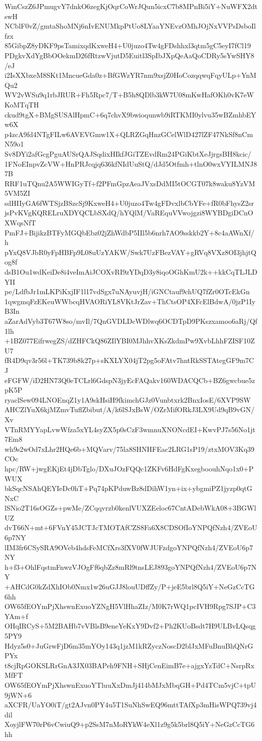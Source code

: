 WmCszZ6JPmugvY7dnkO6zegKjOqrCoWrJQun5icxC7b8MPnBi5iY+NuWFX2dtswH
NCblF0vZ/gmtaShoMNj6nIvENUMkpPtUo8LYaaYNEvzOMhJOjNxVVPsDsboIlfzx
85GibpZ8yDKF9psTamixqdKxweH4+U0juzo4Tw4gFDshhxl3qtm5gC5eyI7fCl19
PDgkvXdYgBbOOekmD26fRtzwVjutD5Euitl3SpIbJXpQeAaQoCDRy5sYwSHY8/eJ
i2IsXXbxeM8SKt1MncueGda0z+BfGWzYR7nm9xsjZ0HoCozqqwqFqyULp+YnMQu2
WV2vWSu9q1rbJRUR+Fh5Rpc7/T+B5h8QDlb3kW7U08mKwHafOKh0vK7eWKoMTqTH
ckud9tgX+BMgSUSAlHpmC+6q7chvX9bwioqunwb9iRTKMI0ylvu35wBZmhbEYw6X
p4zcA9fd4NTgFILw6AVEVGmw1X+QLRZGqHnzGCelWlD427lZF47NkSf8nCmN59o1
Sv8DYi2afGcgPguAUSrQAJSqdixHIkfJGiTZEvdRm24PGiKbtXeJjrgsBH8kcic/
1FNoEInpvZcVW+HnPRJcqjq636kfNIdUuStQ/dJd5Otfmh+tlnO0wxVYILMNJ87B
RRF1uTQnu2A5WWIGyTf+f2PFmGpzAeaJVxsDdMI5tOCGT07k8waku8YzVM5VM5ZI
sdHIIyGA6fWTSjzBSzcSj9KxweH4+U0juzo4Tw4gFDvxlbCbYFe+fR0bFhysZ2sr
jsPvKVgKQRELruXDYQCLbSXdQ/hYQlM/VaREquVVwojgzi8WYBDgiDCnOXWqsNfT
PmFJ+BijikzBTFyMGQbEbz02jZhWdbP5IIl5b6nrh7AO9sskkb2Y+8c4aAWnXf/h
pYxQ8VJbR0yFpHBFp9L08uUzYAKW/Swk7UzFBezVAY+gRVq8VXz8OI3jhjtQog8f
dsB1Ou1wdKeiDe8i4veImAiJCOXvRI9zYDqD3y8iqoOGhKmU2k++kkCqTLJLDYII
pe/LdfbJr1mLKPiKxjIF1l17vdSgx7uNAyuvjH/iGNCtauf9chUQ7fZr0OTcEkGn
1qwgmqFzEKeuWWbcqHVAORiYL8VKtJrZav+ThCtsOP4XFcElBdwA/0jzP1IyB3In
aZarAdVyb3T67W8so/mvIl/7QnGVDLDcWDlwq6OCDTpD9PKszxamoo6aRj/Qf1lh
+1BZ077EifrwegZS/dZHFCkQ86ZIlYBI0MJhhvXKsZkdmPw9XvbLhhFZISF10ZU7
fR4D9qv3r56l+TK739b8k27p+sKXLYX04jT2pg5oFAtv7hntRkSSTAtegGF9m7CJ
eFGFW/iD2HN73Q0eTCLrl6GdspN3jyEcFAQakv160WDACQCb+BZ6gwcbue5zpK5P
ryaclSew094LNOEnqZ1y1A9skHsiH9fkimchGJz0Vunbtxrk2BnxIosE/6XVP9SW
AHCZlYuX6kjMZmvTuflZbibut/A/k6lSJxBsW/OZrMifORkJ3LX9Ud9qB9vGN/Xv
VTnRMYYapLvwWfza5xYL4syZX5p0sCzF3wmnuXNONcdEI+KwvPJ7s56No1jt7Em8
wh9s2wOd7xLhr2HQe6b+MQVarv/75la8SHNHFEac2LRG1sP19/ztxMOV3Kq39COc
hpc/RW+jwgEKjEt4jDbTglo/DXuJOzFQQc1ZKFv6HdFgKxegboouhNqo1x0+PWUX
bkSqcNSAhQEYIeDc0hT+Pq74pKPduwBz8dDihW1yn+ix+ybgmiPZ1jyzp0qtGNxC
lSNio2T16sOGZs+pwMe/ZCqqvrzb0kenlVUXZEeloc67CntADebWkA08+3BGWlUZ
dvT66N+mt+6FVnY45JCTJcTMOTAfCZS8Fa6X8CDSOfIoYNPQfNzh4/ZVEoU6p7NY
lIM3fr6CSySRA9OVeb4hdsFeMCfXrs3fXV0fWJUFzdgoYNPQfNzh4/ZVEoU6p7NY
h+f3+OhlFqstmFnwzVJOgFf6qbZz8mRl9tnsLEJ893goYNPQfNzh4/ZVEoU6p7NY
+AHCdG0kZdXhIOb0Nmx1w26uGJJ8louUDffZy/P+jeE5brl8Q5iY+NeGzCcTG6hh
OW65fEOYmPjXhswnExuoYZNgH5VlHhaZIz/M0K7rWQ1pcIVH9Rpg7SJP+C3YAm+f
OHqIRCyS+5M2BAHb7vVBlsB9eneYeKxY9Dvf2+Ph2KUoBsdt7H9ULBvLQsqg5PY9
Hdyz5s0+JuGrwFjD6m35mYOy143q1jzM1kRZyczNoscD2blJxMFuBnuBhQNrGPYx
t8cjRpGOKSLRrGnA3JX03BAPeh9FNH+SHjCenEimB7e+ajgxYzTdC+NsrpRxMfFT
OW65fEOYmPjXhswnExuoYTluuXxDmJj414bMJxMbqGH+Pd4TCm5vjC+tpU9jWN+6
aXCFR/UaYO0iT/gt2AJvn0PY4u5T1SuNhSwEQ96mttTAfXp3mHisWPQ739vj4dil
XoyjlFW70rP6vCwiuQ9+p2SsM7nMoRYkW4eXl1z9g5k5brl8Q5iY+NeGzCcTG6hh
